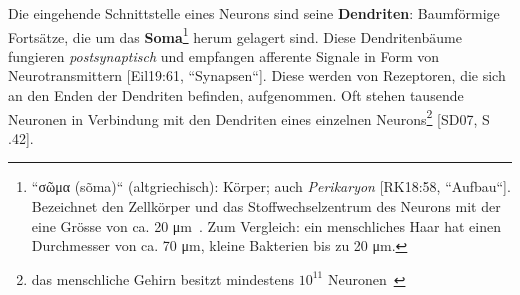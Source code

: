 Die eingehende Schnittstelle eines Neurons sind seine \textbf{Dendriten}: Baumförmige Fortsätze, die um das \textbf{Soma}\footnote{
  ``\textgreek{σῶμα} (sõma)`` (altgriechisch): Körper; auch \textit{Perikaryon} [RK18:58, ``Aufbau``]. Bezeichnet den Zellkörper und das Stoffwechselzentrum des Neurons mit der eine Grösse von ca. 20 μm~\cite[29]{BCP18}. Zum Vergleich: ein menschliches Haar hat einen Durchmesser von ca. 70 μm, kleine Bakterien bis zu 20 μm.
} herum gelagert sind.
Diese Dendritenbäume~\cite[47]{BCP18} fungieren \textit{postsynaptisch} und empfangen afferente Signale in Form von Neurotransmittern [Eil19:61, ``Synapsen``].
Diese werden von Rezeptoren, die sich an den Enden der Dendriten befinden, aufgenommen.
Oft stehen tausende Neuronen in Verbindung mit den Dendriten eines einzelnen Neurons\footnote{
 das menschliche Gehirn besitzt mindestens $10^{11}$ Neuronen~\cite[175]{KSJ+13}
} [SD07, S .42].\\



